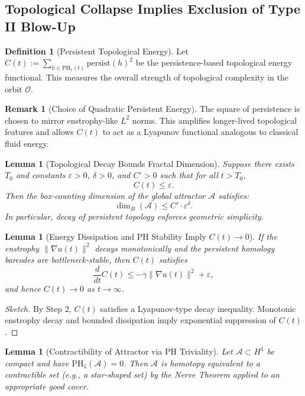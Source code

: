 \documentclass[11pt]{article}
\newtheorem{lemma}[theorem]{Lemma}
\theoremstyle{definition}
\newtheorem{definition}[theorem]{Definition}
\newtheorem{remark}[theorem]{Remark}
\begin{document}
\subsection{Topological Collapse Implies Exclusion of Type II Blow-Up}

\begin{definition}[Persistent Topological Energy]
Let $C(t) := \sum_{h \in \mathrm{PH}_1(t)} \mathrm{persist}(h)^2$ be the persistence-based topological energy functional. This measures the overall strength of topological complexity in the orbit $\mathcal{O}$.
\end{definition}

\begin{remark}[Choice of Quadratic Persistent Energy]
The square of persistence is chosen to mirror enstrophy-like $L^2$ norms. This amplifies longer-lived topological features and allows $C(t)$ to act as a Lyapunov functional analogous to classical fluid energy.
\end{remark}

\begin{lemma}[Topological Decay Bounds Fractal Dimension]
\label{lem:fractal-dim-bound}
Suppose there exists $T_0$ and constants $\varepsilon > 0$, $\delta > 0$, and $C' > 0$ such that for all $t > T_0$,
\[
C(t) \le \varepsilon.
\]
Then the box-counting dimension of the global attractor $\mathcal{A}$ satisfies:
\[
\dim_B(\mathcal{A}) \le C' \cdot \varepsilon^{\delta}.
\]
In particular, decay of persistent topology enforces geometric simplicity.
\end{lemma}

\begin{lemma}[Energy Dissipation and PH Stability Imply $C(t) \to 0$]
If the enstrophy $\|\nabla u(t)\|^2$ decays monotonically and the persistent homology barcodes are bottleneck-stable, then $C(t)$ satisfies
\[
\frac{d}{dt} C(t) \le -\gamma \|\nabla u(t)\|^2 + \varepsilon,
\]
and hence $C(t) \to 0$ as $t \to \infty$.
\end{lemma}

\begin{proof}[Sketch]
By Step 2, $C(t)$ satisfies a Lyapunov-type decay inequality. Monotonic enstrophy decay and bounded dissipation imply exponential suppression of $C(t)$.
\end{proof}

\begin{lemma}[Contractibility of Attractor via PH Triviality]
Let $\mathcal{A} \subset H^1$ be compact and have $\mathrm{PH}_1(\mathcal{A}) = 0$. Then $\mathcal{A}$ is homotopy equivalent to a contractible set (e.g., a star-shaped set) by the Nerve Theorem applied to an appropriate good cover.
\end{lemma}
\end{document}
